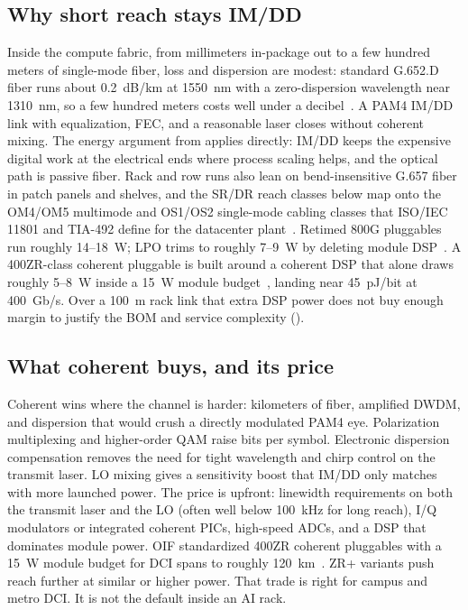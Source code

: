 \subsection{Why short reach stays IM/DD}

Inside the compute fabric, from millimeters in-package out to a few hundred meters
of single-mode fiber, loss and dispersion are modest: standard G.652.D fiber runs
about 0.2~dB/km at 1550~nm with a zero-dispersion wavelength near 1310~nm, so a
few hundred meters costs well under a decibel~\cite{itufiber}. A PAM4 IM/DD link
with equalization, FEC, and a reasonable laser closes without coherent mixing. The
energy argument from  applies directly: IM/DD keeps the
expensive digital work at the electrical ends where process scaling helps, and the
optical path is passive fiber. Rack and row runs also lean on bend-insensitive
G.657 fiber in patch panels and shelves, and the SR/DR reach classes below map onto
the OM4/OM5 multimode and OS1/OS2 single-mode cabling classes that ISO/IEC 11801
and TIA-492 define for the datacenter plant~\cite{fibercabling}. Retimed 800G
pluggables run roughly 14--18~W; LPO trims to roughly 7--9~W by deleting module
DSP~\cite{lpo}. A 400ZR-class coherent pluggable is built around a coherent DSP
that alone draws roughly 5--8~W inside a 15~W module budget~\cite{oif400zr},
landing near 45~pJ/bit at 400~Gb/s. Over a 100~m rack link that extra DSP power
does not buy enough margin to justify the BOM and service complexity
().

\subsection{What coherent buys, and its price}

Coherent wins where the channel is harder: kilometers of fiber, amplified DWDM, and
dispersion that would crush a directly modulated PAM4 eye. Polarization multiplexing
and higher-order QAM raise bits per symbol. Electronic dispersion compensation
removes the need for tight wavelength and chirp control on the transmit laser. LO
mixing gives a sensitivity boost that IM/DD only matches with more launched power.
The price is upfront: linewidth requirements on both the transmit laser and the LO
(often well below 100~kHz for long reach), I/Q modulators or integrated coherent
PICs, high-speed ADCs, and a DSP that dominates module power. OIF standardized
400ZR coherent pluggables with a 15~W module budget for DCI spans to roughly
120~km~\cite{oif400zr}. ZR+ variants push reach further at similar or higher
power. That trade is right for campus and metro DCI. It is not the default inside
an AI rack.

